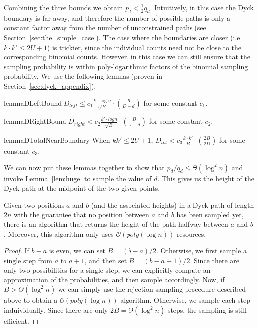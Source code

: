 Combining the three bounds we obtain $p_d < \frac 12 q_d$.
Intuitively, in this case the Dyck boundary is far away, and therefore the number of possible paths
is only a constant factor away from the number of unconstrained paths (see Section~\ref{sec:the_simple_case}).
The case where the boundaries are closer (i.e. $k\cdot k' \le 2U+1$) is trickier,
since the individual counts need not be close to the corresponding binomial counts.
However, in this case we can still ensure that the sampling probability is within
poly-logarithmic factors of the binomial sampling probability.
We use the following lemmas (proven in Section~\ref{sec:dyck_appendix}).

\begin{restatable}{lemma}{DLeftBound}
\label{lem:DLeftBound}
$D_{left} \le c_1 \frac{ k\cdot\log n}{\sqrt{B}}\cdot{{B}\choose{D-d}}$ for some constant $c_1$.
\end{restatable}

\begin{restatable}{lemma}{DRightBound}
\label{lem:DRightBound}
$D_{right} < c_2 \frac{k'\cdot log n}{\sqrt{B}}\cdot{{B}\choose{U-d}}$ for some constant $c_2$.
\end{restatable}

\begin{restatable}{lemma}{DTotalNearBoundary}
\label{lem:DTotalNearBoundary}
When $kk' \le 2U + 1$, $D_{tot} < c_3 \frac{k\cdot k'}{B}\cdot{{2B}\choose{2D}}$ for some constant $c_3$.
\end{restatable}

We can now put these lemmas together to show that $p_d/q_d \le \Theta(\log^2 n)$ and invoke Lemma~\ref{lem:huge} to sample the value of $d$.
This gives us the height of the Dyck path at the midpoint of the two given points.

\begin{theorem}
\label{thm:dyck_midpoint_sampling}
Given two positions $a$ and $b$ (and the associated heights) in a Dyck path of length $2n$
with the guarantee that no position between $a$ and $b$ has been sampled yet,
there is an algorithm that returns the height of the path halfway between $a$ and $b$.
Moreover, this algorithm only uses $\mathcal O(poly(\log n))$ resources.
\end{theorem}
\begin{proof}
If $b-a$ is even, we can set $B = (b-a)/2$.
Otherwise, we first sample a single step from $a$ to $a+1$, and then set $B = (b-a-1)/2$.
Since there are only two possibilities for a single step,
we can explicitly compute an approximation of the probabilities, and then sample accordingly.
Now, if $B > \Theta(\log^2 n)$ we can simply use the rejection sampling procedure described above
to obtain a $\mathcal O(poly(\log n))$ algorithm.
Otherwise, we sample each step induividually.
Since there are only $2B = \Theta(\log^2 n)$ steps, the sampling is still efficient.
\end{proof}

